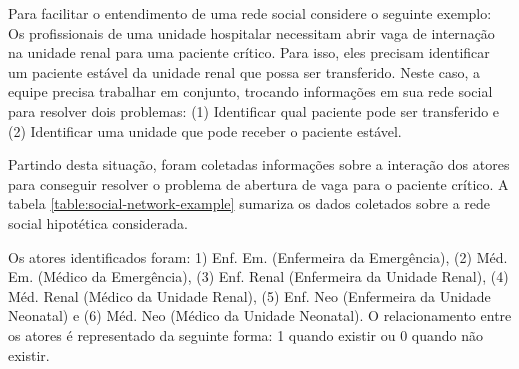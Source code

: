 Para facilitar o entendimento de uma rede social considere o seguinte exemplo: Os profissionais de uma unidade hospitalar necessitam abrir vaga de internação na unidade renal para uma paciente crítico. Para isso, eles precisam identificar um paciente estável da unidade renal que possa ser transferido. Neste caso, a equipe precisa trabalhar em conjunto, trocando informações em sua rede social para resolver dois problemas: (1) Identificar qual paciente pode ser transferido e (2) Identificar uma unidade que pode receber o paciente estável.

Partindo desta situação, foram coletadas informações sobre a interação dos atores para conseguir resolver o problema de abertura de vaga para o paciente crítico. A tabela \ref{table:social-network-example} sumariza os dados coletados sobre a rede social hipotética considerada. 

Os atores identificados foram: 1) Enf. Em. (Enfermeira da Emergência), (2) Méd. Em. (Médico da Emergência), (3) Enf. Renal (Enfermeira da Unidade Renal), (4) Méd. Renal (Médico da Unidade Renal), (5) Enf. Neo (Enfermeira da Unidade Neonatal) e (6) Méd. Neo (Médico da Unidade Neonatal). O relacionamento entre os atores é representado da seguinte forma: 1 quando existir ou 0 quando não existir.

